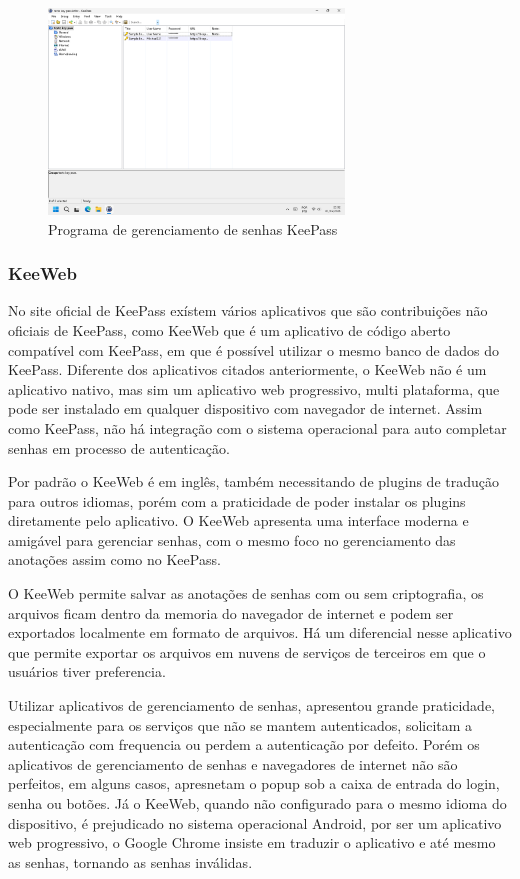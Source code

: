 \documentclass[12pt]{article}
\begin{document}
\begin{figure}[h!]
  \centering
  \includegraphics[width=0.7\textwidth]{./assets/keepass.png}
  \caption{Programa de gerenciamento de senhas KeePass}
  \label{fig:KeePass}
\end{figure}

\subsubsection{KeeWeb}

No site oficial de KeePass exístem vários aplicativos que são contribuições não oficiais
de KeePass, como KeeWeb que é um aplicativo de código aberto compatível com KeePass, em
que é possível utilizar o mesmo banco de dados do KeePass.
Diferente dos aplicativos citados anteriormente, o KeeWeb não é um aplicativo
nativo, mas sim um aplicativo web progressivo, multi plataforma, que pode ser instalado
em qualquer dispositivo com navegador de internet.
Assim como KeePass, não há integração com o sistema operacional para auto completar senhas
em processo de autenticação.

Por padrão o KeeWeb é em inglês, também necessitando de plugins de tradução para outros
idiomas, porém com a praticidade de poder instalar os plugins diretamente pelo aplicativo.
O KeeWeb apresenta uma interface moderna e amigável para gerenciar senhas, com o mesmo foco
no gerenciamento das anotações assim como no KeePass.

O KeeWeb permite salvar as anotações de senhas com ou sem criptografia, os arquivos ficam
dentro da memoria do navegador de internet e podem ser exportados localmente em formato de
arquivos.
Há um diferencial nesse aplicativo que permite exportar os arquivos em nuvens de serviços
de terceiros em que o usuários tiver preferencia.

Utilizar aplicativos de gerenciamento de senhas, apresentou grande praticidade,
especialmente para os serviços que não se mantem autenticados, solicitam a
autenticação com frequencia ou perdem a autenticação por defeito.
Porém os aplicativos de gerenciamento de senhas e navegadores de internet não
são perfeitos, em alguns casos, apresnetam o popup sob a caixa de entrada do
login, senha ou botões.
Já o KeeWeb, quando não configurado para o mesmo idioma do dispositivo, é
prejudicado no sistema operacional Android, por ser um aplicativo web progressivo,
o Google Chrome insiste em traduzir o aplicativo e até mesmo as senhas, tornando
as senhas inválidas.
\end{document}

